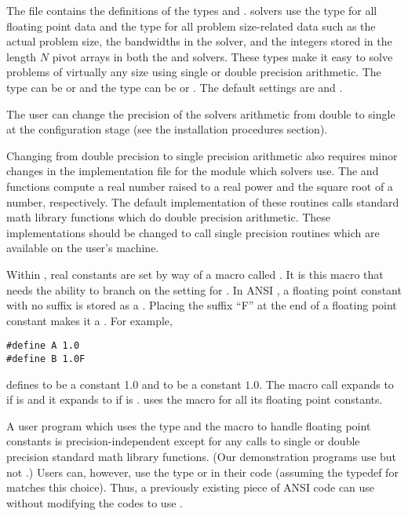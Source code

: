 %
The  file contains the definitions of the types  and
. {\sundials} solvers use the type  for all floating point data and
the type  for all problem size-related data such as the actual
problem size, the bandwidths in the {\band} solver, and the integers
stored in the length $N$ pivot arrays in both the {\dense} and {\band} solvers.
These types make it easy to solve problems of virtually any size
using single or double precision arithmetic. The type  can be
 or  and the type  can be  or
. The default settings are  and .

The user can change the precision of the {\sundials} solvers arithmetic from double 
to single at the configuration stage (see the {\sundials} installation procedures section).

Changing from double precision to single precision arithmetic also
requires minor changes in the implementation file  for
the {\sundialsmath} module which {\sundials} solvers use. The  and
 functions compute a real number raised to a real power and the
square root of a number, respectively. The default implementation of
these routines calls standard {\C} math library functions which do double
precision arithmetic. These implementations should be changed to call
single precision routines which are available on the user's machine.

Within {\sundials}, real constants are set by way of a macro called
.  It is this macro that needs the ability to branch on the
setting for .  In ANSI {\C}, a floating point constant with no
suffix is stored as a .  Placing the suffix ``F'' at the
end of a floating point constant makes it a . For example,
\begin{verbatim}
#define A 1.0
#define B 1.0F
\end{verbatim}
defines  to be a  constant 1.0 and  to be a
 constant $1.0$. The macro call 
expands to  if  is  and it expands to
 if  is . {\sundials} uses the  macro for
all its floating point constants. 

A user program which uses the type  and the  macro
to handle floating point constants is precision-independent except for
any calls to single or double precision standard math library
functions.  (Our demonstration programs use  but not
.)  Users can, however, use the type  or
 in their code (assuming the typedef for  matches
this choice).  Thus, a previously existing piece of ANSI {\C} code can use
{\sundials} without modifying the codes to use .

